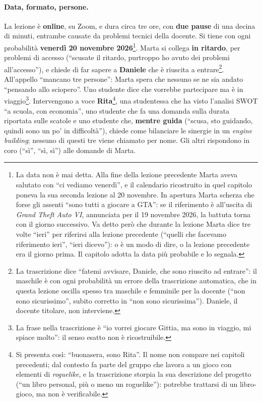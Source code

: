 \paragraph{Data, formato, persone.} La lezione è \textbf{online}, su Zoom, e dura circa tre
ore, con \textbf{due pause} di una decina di minuti, entrambe causate da problemi tecnici
della docente. Si tiene con ogni probabilità \textbf{venerdì 20 novembre
2026}\footnote{La data non è mai detta. Alla fine della lezione precedente Marta aveva
salutato con ``ci vediamo venerdì'', e il calendario ricostruito in quel capitolo poneva la
sua seconda lezione al 20 novembre. In apertura Marta scherza che forse gli assenti ``sono
tutti a giocare a GTA'': se il riferimento è all'uscita di \emph{Grand Theft Auto VI},
annunciata per il 19 novembre 2026, la battuta torna con il giorno successivo. Va detto però
che durante la lezione Marta dice tre volte ``ieri'' per riferirsi alla lezione precedente
(``quelli che facevamo riferimento ieri'', ``ieri dicevo''): o è un modo di dire, o la
lezione precedente era il giorno prima. Il capitolo adotta la data più probabile e lo
segnala.}. Marta si collega \textbf{in ritardo}, per problemi di accesso (``scusate il
ritardo, purtroppo ho avuto dei problemi all'accesso''), e chiede di far sapere a
\textbf{Daniele} che è riuscita a entrare\footnote{La trascrizione dice ``fatemi avvisare,
Daniele, che sono riuscito ad entrare'': il maschile è con ogni probabilità un errore della
trascrizione automatica, che in questa lezione oscilla spesso tra maschile e femminile per
la docente (``non sono sicurissimo'', subito corretto in ``non sono sicurissima''). Daniele,
il docente titolare, non interviene.}. All'appello ``mancano tre persone'': Marta spera che
nessuno se ne sia andato ``pensando allo sciopero''. Uno studente dice che vorrebbe
partecipare ma è in viaggio\footnote{La frase nella trascrizione è ``io vorrei giocare
Gittia, ma sono in viaggio, mi spiace molto'': il senso esatto non è ricostruibile.}.
Intervengono a voce \textbf{Rita}\footnote{Si presenta così: ``buonasera, sono Rita''. Il
nome non compare nei capitoli precedenti; dal contesto fa parte del gruppo che lavora a un
gioco con elementi di \emph{roguelike}, e la trascrizione storpia la sua descrizione del
progetto (``un libro personal, più o meno un roguelike''): potrebbe trattarsi di un
libro-gioco, ma non è verificabile.}, una studentessa che ha visto l'analisi SWOT ``a scuola,
con economia'', uno studente che fa una domanda sulla durata riportata sulle scatole e uno
studente che, \textbf{mentre guida} (``scusa, sto guidando, quindi sono un po' in
difficoltà''), chiede come bilanciare le sinergie in un \emph{engine building}; nessuno di
questi tre viene chiamato per nome. Gli altri rispondono in coro (``sì'', ``sì, sì'') alle
domande di Marta.


